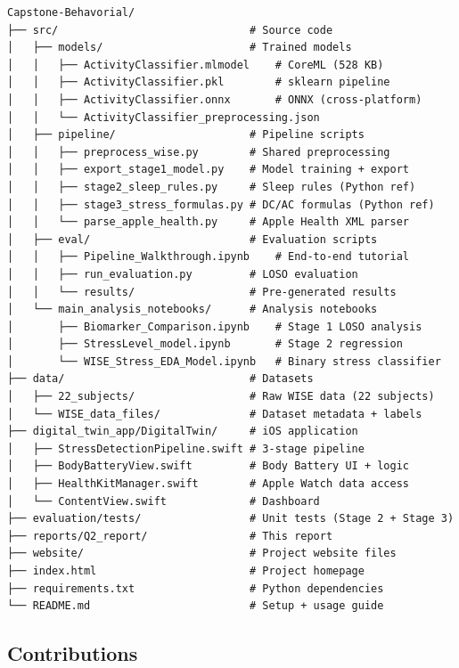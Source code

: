 \documentclass[12pt,letterpaper]{article}
\begin{document}
{\footnotesize
\begin{verbatim}
Capstone-Behavorial/
├── src/                              # Source code
│   ├── models/                       # Trained models
│   │   ├── ActivityClassifier.mlmodel    # CoreML (528 KB)
│   │   ├── ActivityClassifier.pkl        # sklearn pipeline
│   │   ├── ActivityClassifier.onnx       # ONNX (cross-platform)
│   │   └── ActivityClassifier_preprocessing.json
│   ├── pipeline/                     # Pipeline scripts
│   │   ├── preprocess_wise.py        # Shared preprocessing
│   │   ├── export_stage1_model.py    # Model training + export
│   │   ├── stage2_sleep_rules.py     # Sleep rules (Python ref)
│   │   ├── stage3_stress_formulas.py # DC/AC formulas (Python ref)
│   │   └── parse_apple_health.py     # Apple Health XML parser
│   ├── eval/                         # Evaluation scripts
│   │   ├── Pipeline_Walkthrough.ipynb    # End-to-end tutorial
│   │   ├── run_evaluation.py         # LOSO evaluation
│   │   └── results/                  # Pre-generated results
│   └── main_analysis_notebooks/      # Analysis notebooks
│       ├── Biomarker_Comparison.ipynb    # Stage 1 LOSO analysis
│       ├── StressLevel_model.ipynb       # Stage 2 regression
│       └── WISE_Stress_EDA_Model.ipynb   # Binary stress classifier
├── data/                             # Datasets
│   ├── 22_subjects/                  # Raw WISE data (22 subjects)
│   └── WISE_data_files/              # Dataset metadata + labels
├── digital_twin_app/DigitalTwin/     # iOS application
│   ├── StressDetectionPipeline.swift # 3-stage pipeline
│   ├── BodyBatteryView.swift         # Body Battery UI + logic
│   ├── HealthKitManager.swift        # Apple Watch data access
│   └── ContentView.swift             # Dashboard
├── evaluation/tests/                 # Unit tests (Stage 2 + Stage 3)
├── reports/Q2_report/                # This report
├── website/                          # Project website files
├── index.html                        # Project homepage
├── requirements.txt                  # Python dependencies
└── README.md                         # Setup + usage guide
\end{verbatim}
}


\subsection{Contributions}
\end{document}
